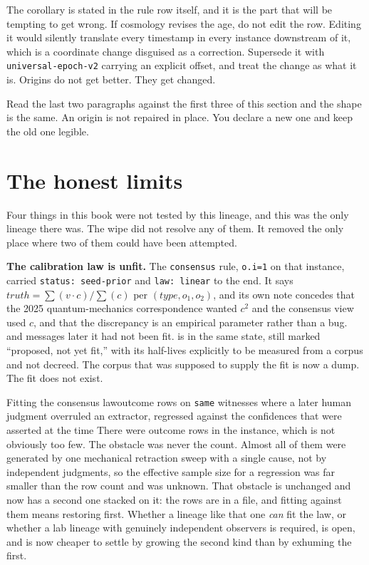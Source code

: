 The corollary is stated in the rule row itself, and it is the part that will be tempting to get wrong. If cosmology revises the age, do not edit the row. Editing it would silently translate every timestamp in every instance downstream of it, which is a coordinate change disguised as a correction. Supersede it with \texttt{universal-epoch-v2} carrying an explicit offset, and treat the change as what it is. Origins do not get better. They get changed.

Read the last two paragraphs against the first three of this section and the shape is the same. An origin is not repaired in place. You declare a new one and keep the old one legible.

\section{The honest limits}
\label{sec:limits}

Four things in this book were not tested by this lineage, and this was the only lineage there was. The wipe did not resolve any of them. It removed the only place where two of them could have been attempted.

\textbf{The calibration law is unfit.} The \texttt{consensus} rule, \texttt{o.i=1} on that instance, carried \texttt{status: seed-prior} and \texttt{law: linear} to the end. It says $truth = \sum(v \cdot c) / \sum(c)$ per $(type, o_1, o_2)$, and its own note concedes that the 2025 quantum-mechanics correspondence wanted $c^2$ and the consensus view used $c$, and that the discrepancy is an empirical parameter rather than a bug. \labLineageLifetime{} and \labLineageMessagesRound{} messages later it had not been fit.  is in the same state, still marked ``proposed, not yet fit,'' with its half-lives explicitly to be measured from a corpus and not decreed. The corpus that was supposed to supply the fit is now a dump. The fit does not exist.

\begin{Open}{Fitting the consensus law}{outcome rows on \texttt{same} witnesses where a later human judgment overruled an extractor, regressed against the confidences that were asserted at the time}
There were \labLineageOutcomes{} outcome rows in the \labLineageName{} instance, which is not obviously too few. The obstacle was never the count. Almost all of them were generated by one mechanical retraction sweep with a single cause, not by independent judgments, so the effective sample size for a regression was far smaller than the row count and was unknown. That obstacle is unchanged and now has a second one stacked on it: the rows are in a file, and fitting against them means restoring \labLineageSize{} first. Whether a lineage like that one \emph{can} fit the law, or whether a lab lineage with genuinely independent observers is required, is open, and is now cheaper to settle by growing the second kind than by exhuming the first.
\end{Open}


